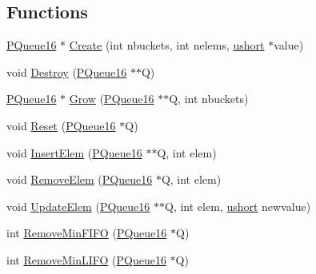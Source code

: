 \subsection*{Functions}
\begin{DoxyCompactItemize}
\item 
\hyperlink{namespacegft_1_1PQueue16_afab9efb91a79a40b6b74c53c0c19da3d}{P\-Queue16} $\ast$ \hyperlink{namespacegft_1_1PQueue16_a3ac0b66b0b6d6d9904560c9b440ef754}{Create} (int nbuckets, int nelems, \hyperlink{namespacegft_a878518cf75338c097e2c8e9b10bfb00d}{ushort} $\ast$value)
\item 
void \hyperlink{namespacegft_1_1PQueue16_a0df7fe603e2c64797969aaed2761980c}{Destroy} (\hyperlink{namespacegft_1_1PQueue16_afab9efb91a79a40b6b74c53c0c19da3d}{P\-Queue16} $\ast$$\ast$Q)
\item 
\hyperlink{namespacegft_1_1PQueue16_afab9efb91a79a40b6b74c53c0c19da3d}{P\-Queue16} $\ast$ \hyperlink{namespacegft_1_1PQueue16_aeb4364ff5fc2e762f5491758b39c325a}{Grow} (\hyperlink{namespacegft_1_1PQueue16_afab9efb91a79a40b6b74c53c0c19da3d}{P\-Queue16} $\ast$$\ast$Q, int nbuckets)
\item 
void \hyperlink{namespacegft_1_1PQueue16_a1c9ceadbab25dfee3f2b5348fe3a524c}{Reset} (\hyperlink{namespacegft_1_1PQueue16_afab9efb91a79a40b6b74c53c0c19da3d}{P\-Queue16} $\ast$Q)
\item 
void \hyperlink{namespacegft_1_1PQueue16_aceba12c8e4a72989c32ae9622a678594}{Insert\-Elem} (\hyperlink{namespacegft_1_1PQueue16_afab9efb91a79a40b6b74c53c0c19da3d}{P\-Queue16} $\ast$$\ast$Q, int elem)
\item 
void \hyperlink{namespacegft_1_1PQueue16_a06fff433316b7d62a80459dff4048e8a}{Remove\-Elem} (\hyperlink{namespacegft_1_1PQueue16_afab9efb91a79a40b6b74c53c0c19da3d}{P\-Queue16} $\ast$Q, int elem)
\item 
void \hyperlink{namespacegft_1_1PQueue16_a69b76e15712538323fec12c18a916342}{Update\-Elem} (\hyperlink{namespacegft_1_1PQueue16_afab9efb91a79a40b6b74c53c0c19da3d}{P\-Queue16} $\ast$$\ast$Q, int elem, \hyperlink{namespacegft_a878518cf75338c097e2c8e9b10bfb00d}{ushort} newvalue)
\item 
int \hyperlink{namespacegft_1_1PQueue16_ad941c55ff86456e7fd3259ddd186359f}{Remove\-Min\-F\-I\-F\-O} (\hyperlink{namespacegft_1_1PQueue16_afab9efb91a79a40b6b74c53c0c19da3d}{P\-Queue16} $\ast$Q)
\item 
int \hyperlink{namespacegft_1_1PQueue16_a9fef7c321324d4ccb71fd510a97f9ad1}{Remove\-Min\-L\-I\-F\-O} (\hyperlink{namespacegft_1_1PQueue16_afab9efb91a79a40b6b74c53c0c19da3d}{P\-Queue16} $\ast$Q)

\end{DoxyCompactItemize}
